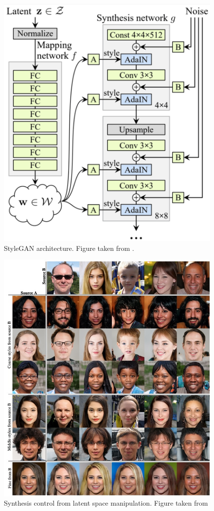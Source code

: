 \begin{figure}[tb]
      \begin{center}
          \includegraphics[width=0.5\linewidth]{images/related/stylegan.jpg}
      \end{center}
      \caption{StyleGAN architecture. Figure taken from \cite{karra2019stylegan}.}
      \label{fig:stylegan}
  \end{figure}

  \begin{figure}[tb]
      \begin{center}
          \includegraphics[width=0.7\linewidth]{images/related/stylegan_styles.jpg}
      \end{center}
      \caption{Synthesis control from latent space manipulation. Figure taken from \cite{karra2019stylegan}}
      \label{fig:stylegan_styles}
  \end{figure}

